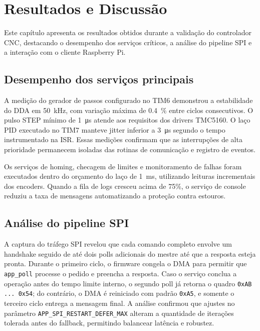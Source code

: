 \chapter{Resultados e Discussão}\label{cap:resultados}

Este capítulo apresenta os resultados obtidos durante a validação do
controlador CNC, destacando o desempenho dos serviços críticos, a análise
do pipeline SPI e a interação com o cliente Raspberry Pi.

\section{Desempenho dos serviços principais}

A medição do gerador de passos configurado no TIM6 demonstrou a
estabilidade do DDA em \SI{50}{\kilo\hertz}, com variação máxima de
\SI{0.4}{\percent} entre ciclos consecutivos. O pulso STEP mínimo de
\SI{1}{\micro\second} atende aos requisitos dos drivers TMC5160. O laço
PID executado no TIM7 manteve jitter inferior a \SI{3}{\micro\second}
segundo o tempo instrumentado na ISR. Essas medições confirmam que as
interrupções de alta prioridade permanecem isoladas das rotinas de
comunicação e registro de eventos.

Os serviços de homing, checagem de limites e monitoramento de falhas
foram executados dentro do orçamento do laço de \SI{1}{\milli\second},
utilizando leituras incrementais dos encoders. Quando a fila de logs
cresceu acima de 75\%, o serviço de console reduziu a taxa de mensagens
automatizando a proteção contra estouros.

\section{Análise do pipeline SPI}

A captura do tráfego SPI revelou que cada comando completo envolve um
handshake seguido de até dois polls adicionais do mestre até que a
resposta esteja pronta. Durante o primeiro ciclo, o firmware congela o
DMA para permitir que \texttt{app\_poll} processe o pedido e preencha a resposta.
Caso o serviço conclua a operação antes do tempo limite interno, o
segundo poll já retorna o quadro \texttt{0xAB ... 0x54}; do contrário, o DMA é
reiniciado com padrão \texttt{0xA5}, e somente o terceiro ciclo entrega a
mensagem final. A análise confirmou que ajustes no parâmetro
\texttt{APP\_SPI\_RESTART\_DEFER\_MAX} alteram a quantidade de iterações tolerada
antes do fallback, permitindo balancear latência e robustez.

